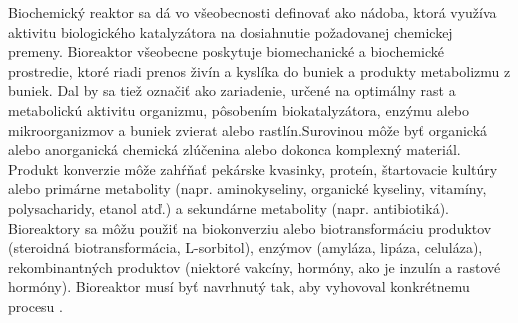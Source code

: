 Biochemický reaktor sa dá vo všeobecnosti definovať ako nádoba, ktorá využíva aktivitu biologického katalyzátora na dosiahnutie požadovanej chemickej premeny. Bioreaktor všeobecne poskytuje biomechanické a biochemické prostredie, ktoré riadi prenos živín a kyslíka do buniek a produkty metabolizmu z buniek. Dal by sa tiež označiť ako zariadenie, určené na optimálny rast a metabolickú aktivitu organizmu, pôsobením biokatalyzátora, enzýmu alebo mikroorganizmov a buniek zvierat alebo rastlín.Surovinou môže byť organická alebo anorganická chemická zlúčenina alebo dokonca komplexný materiál. Produkt konverzie môže zahŕňať pekárske kvasinky, proteín, štartovacie kultúry alebo primárne metabolity (napr. aminokyseliny, organické kyseliny, vitamíny, polysacharidy, etanol atď.) a sekundárne metabolity (napr. antibiotiká). Bioreaktory sa môžu použiť na biokonverziu alebo biotransformáciu produktov (steroidná biotransformácia, L-sorbitol), enzýmov (amyláza, lipáza, celuláza), rekombinantných produktov (niektoré vakcíny, hormóny, ako je inzulín a rastové hormóny). Bioreaktor musí byť navrhnutý tak, aby vyhovoval konkrétnemu procesu \cite{ref1}.

